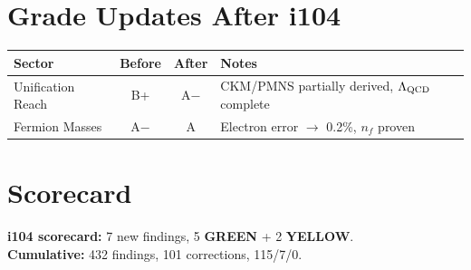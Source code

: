 \documentclass[11pt,a4paper]{article}
\theoremstyle{remark}
\newcommand{\GREEN}{\textcolor{dfdgreen}{\textbf{GREEN}}}
\newcommand{\YELLOW}{\textcolor{dfdred!70!black}{\textbf{YELLOW}}}
\begin{document}
\section{Grade Updates After i104}

\begin{center}
\begin{tabular}{lccl}
\toprule
\textbf{Sector} & \textbf{Before} & \textbf{After} & \textbf{Notes} \\
\midrule
Unification Reach & B+ & A$-$ & CKM/PMNS partially derived, $\Lambda_{\rm QCD}$ complete \\
Fermion Masses & A$-$ & A & Electron error $\to$ 0.2\%, $n_f$ proven \\
\bottomrule
\end{tabular}
\end{center}

\section{Scorecard}

\textbf{i104 scorecard:} 7 new findings, 5 \GREEN{} + 2 \YELLOW{}.\\
\textbf{Cumulative:} 432 findings, 101 corrections, 115/7/0.
\end{document}
